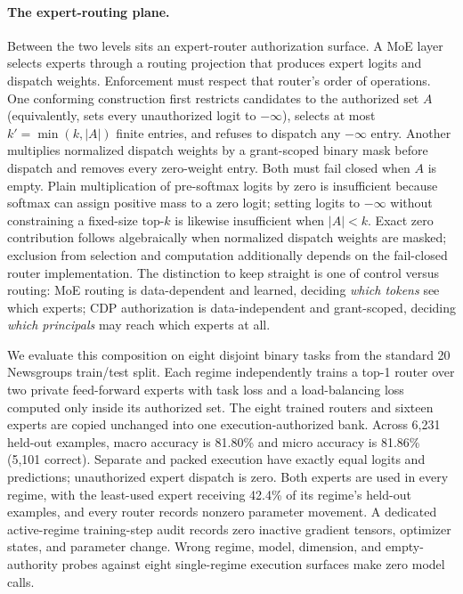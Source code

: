 \documentclass[11pt,a4paper]{article}
\begin{document}
\paragraph{The expert-routing plane.}
\label{sec:moe-routing}
Between the two levels sits an expert-router authorization surface.
A MoE layer selects experts through a routing projection that produces
expert logits and dispatch weights.  Enforcement must respect that
router's order of operations.  One conforming construction first
restricts candidates to the authorized set $A$ (equivalently, sets
every unauthorized logit to $-\infty$), selects at most
$k'=\min(k,|A|)$ finite entries, and refuses to dispatch any
$-\infty$ entry.  Another multiplies normalized dispatch weights by a
grant-scoped binary mask before dispatch and removes every zero-weight
entry.  Both must fail closed when $A$ is empty.  Plain multiplication
of pre-softmax logits by zero is insufficient because softmax can
assign positive mass to a zero logit; setting logits to $-\infty$
without constraining a fixed-size top-$k$ is likewise insufficient
when $|A|<k$.  Exact zero contribution follows algebraically when
normalized dispatch weights are masked; exclusion from selection and
computation additionally depends on the fail-closed router
implementation.  The distinction to keep straight is
one of control versus routing: MoE routing is data-dependent and
learned, deciding \emph{which tokens} see which experts; CDP
authorization is data-independent and grant-scoped, deciding
\emph{which principals} may reach which experts at all.

We evaluate this composition on eight disjoint binary tasks from the standard
20 Newsgroups train/test split. Each regime independently trains a top-1 router
over two private feed-forward experts with task loss and a load-balancing loss
computed only inside its authorized set. The eight trained routers and sixteen
experts are copied unchanged into one execution-authorized bank. Across 6,231
held-out examples, macro accuracy is 81.80\% and micro accuracy is 81.86\%
(5,101 correct). Separate and packed execution have exactly equal logits and
predictions; unauthorized expert dispatch is zero. Both experts are used in
every regime, with the least-used expert receiving 42.4\% of its regime's
held-out examples, and every router records nonzero parameter movement. A
dedicated active-regime training-step audit records zero inactive gradient
tensors, optimizer states, and parameter change. Wrong regime, model,
dimension, and empty-authority probes against eight single-regime execution
surfaces make zero model calls.
\end{document}
